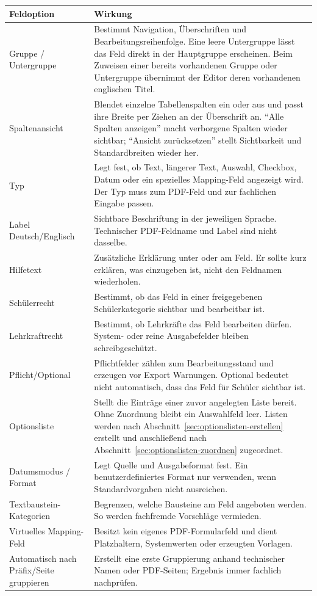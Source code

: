 \documentclass[12pt,a4paper]{article}
\begin{document}
\small
\begin{longtable}{|p{}|p{}|}
\hline
\textbf{Feldoption} & \textbf{Wirkung}\\
\hline
Gruppe / Untergruppe & Bestimmt Navigation, Überschriften und Bearbeitungsreihenfolge. Eine leere Untergruppe lässt das Feld direkt in der Hauptgruppe erscheinen. Beim Zuweisen einer bereits vorhandenen Gruppe oder Untergruppe übernimmt der Editor deren vorhandenen englischen Titel.\\
\hline
Spaltenansicht & Blendet einzelne Tabellenspalten ein oder aus und passt ihre Breite per Ziehen an der Überschrift an. \enquote{Alle Spalten anzeigen} macht verborgene Spalten wieder sichtbar; \enquote{Ansicht zurücksetzen} stellt Sichtbarkeit und Standardbreiten wieder her.\\
\hline
Typ & Legt fest, ob Text, längerer Text, Auswahl, Checkbox, Datum oder ein spezielles Mapping-Feld angezeigt wird. Der Typ muss zum PDF-Feld und zur fachlichen Eingabe passen.\\
\hline
Label Deutsch/Englisch & Sichtbare Beschriftung in der jeweiligen Sprache. Technischer PDF-Feldname und Label sind nicht dasselbe.\\
\hline
Hilfetext & Zusätzliche Erklärung unter oder am Feld. Er sollte kurz erklären, was einzugeben ist, nicht den Feldnamen wiederholen.\\
\hline
Schülerrecht & Bestimmt, ob das Feld in einer freigegebenen Schülerkategorie sichtbar und bearbeitbar ist.\\
\hline
Lehrkraftrecht & Bestimmt, ob Lehrkräfte das Feld bearbeiten dürfen. System- oder reine Ausgabefelder bleiben schreibgeschützt.\\
\hline
Pflicht/Optional & Pflichtfelder zählen zum Bearbeitungsstand und erzeugen vor Export Warnungen. Optional bedeutet nicht automatisch, dass das Feld für Schüler sichtbar ist.\\
\hline
Optionsliste & Stellt die Einträge einer zuvor angelegten Liste bereit. Ohne Zuordnung bleibt ein Auswahlfeld leer. Listen werden nach Abschnitt~\ref{sec:optionslisten-erstellen} erstellt und anschließend nach Abschnitt~\ref{sec:optionslisten-zuordnen} zugeordnet.\\
\hline
Datumsmodus / Format & Legt Quelle und Ausgabeformat fest. Ein benutzerdefiniertes Format nur verwenden, wenn Standardvorgaben nicht ausreichen.\\
\hline
Textbaustein-Kategorien & Begrenzen, welche Bausteine am Feld angeboten werden. So werden fachfremde Vorschläge vermieden.\\
\hline
Virtuelles Mapping-Feld & Besitzt kein eigenes PDF-Formularfeld und dient Platzhaltern, Systemwerten oder erzeugten Vorlagen.\\
\hline
Automatisch nach Präfix/Seite gruppieren & Erstellt eine erste Gruppierung anhand technischer Namen oder PDF-Seiten; Ergebnis immer fachlich nachprüfen.\\
\hline
\end{longtable}
\normalsize
\end{document}

